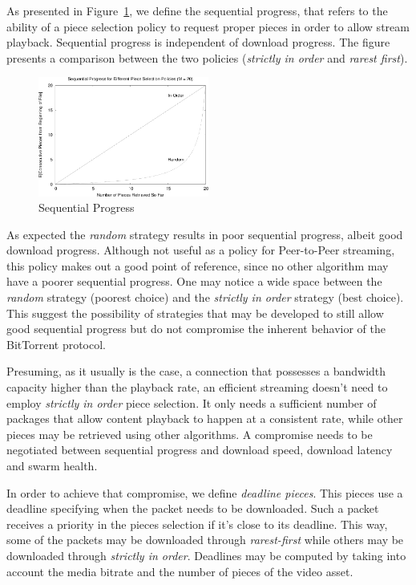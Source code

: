 As presented in Figure~\ref{fig:multimedia-dist:sequential-progress}, we define the
sequential progress, that
refers to the ability of a piece selection policy to request proper pieces in
order to allow stream playback. Sequential progress is independent of download
progress. The figure presents a comparison between the two policies
(\textit{strictly in order} and \textit{rarest first}).

\begin{figure}
  \centering
  \includegraphics[width=0.5\textwidth]{src/img/multimedia-dist/sequential-progress}
  \caption{Sequential Progress}
  \label{fig:multimedia-dist:sequential-progress}
\end{figure}

As expected the \textit{random} strategy results in poor sequential progress,
albeit good download progress. Although not useful as a policy for
Peer-to-Peer streaming, this policy makes out a good point of reference, since
no other algorithm may have a poorer sequential progress. One may notice a
wide space between the \textit{random} strategy (poorest choice) and the
\textit{strictly in order} strategy (best choice). This suggest the
possibility of strategies that may be developed to still allow good
sequential progress but do not compromise the inherent behavior of the
BitTorrent protocol.

Presuming, as it usually is the case, a connection that possesses a bandwidth
capacity higher than the playback rate, an efficient streaming doesn't need to
employ \textit{strictly in order} piece selection. It only needs a sufficient
number of packages that allow content playback to happen at a consistent rate,
while other pieces may be retrieved using other algorithms. A compromise needs
to be negotiated between sequential progress and download speed, download
latency and swarm health.

In order to achieve that compromise, we define \textit{deadline pieces}. This
pieces use a deadline specifying when the packet needs to be downloaded. Such
a packet receives a priority in the pieces selection if it's close to its
deadline. This way, some of the packets may be downloaded through
\textit{rarest-first} while others may be downloaded through \textit{strictly
in order}. Deadlines may be computed by taking into account the media bitrate
and the number of pieces of the video asset.

